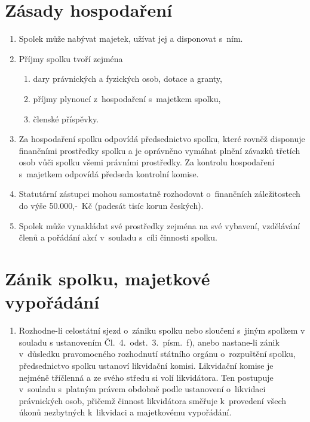 \documentclass[a4paper]{article}
\begin{document}
\section{Zásady hospodaření}
    \begin{enumerate}
    \item Spolek může nabývat majetek, užívat jej a disponovat s~ním.

    \item Příjmy spolku tvoří zejména
        \begin{enumerate}
        \item dary právnických a fyzických osob, dotace a granty,
        \item příjmy plynoucí z~hospodaření s~majetkem spolku,
        \item členské příspěvky.
        \end{enumerate}

    \item Za hospodaření spolku odpovídá předsednictvo spolku, které
        rovněž disponuje finančními prostředky spolku a je oprávněno vymáhat
        plnění závazků třetích osob vůči spolku všemi právními prostředky.
        Za kontrolu hospodaření s~majetkem odpovídá předseda kontrolní komise.

    \item Statutární zástupci mohou samostatně rozhodovat o~finančních
        záležitostech do výše 50.000,-~Kč (padesát tisíc korun českých).

    \item Spolek může vynakládat své prostředky zejména na své vybavení,
        vzdělávání členů a pořádání akcí v~souladu s~cíli činnosti spolku.
    \end{enumerate}



\section{Zánik spolku, majetkové vypořádání}
    \begin{enumerate}
    \item Rozhodne-li celostátní sjezd o~zániku spolku nebo sloučení s~jiným
        spolkem v souladu s ustanovením Čl.~4.~odst.~3.~písm.~f), anebo
        nastane-li zánik v~důsledku pravomocného rozhodnutí státního orgánu
        o~rozpuštění spolku, předsednictvo spolku ustanoví likvidační
        komisi. Likvidační komise je nejméně tříčlenná a ze svého středu si 
        volí likvidátora. Ten postupuje v~souladu s~platným právem obdobně
        podle ustanovení o~likvidaci právnických osob, přičemž činnost
        likvidátora směřuje k~provedení všech úkonů nezbytných k~likvidaci a
        majetkovému vypořádání.
    \end{enumerate}
\end{document}

